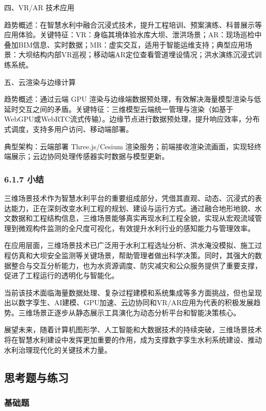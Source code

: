 四、VR/AR 技术应用

趋势概述：在智慧水利中融合沉浸式技术，提升工程培训、预案演练、科普展示等应用体验。关键特征：VR：身临其境体验水库大坝、泄洪场景；AR：现场巡检中叠加BIM信息、实时数据；MR：虚实交互，适用于智能运维支持；典型应用场景：大坝结构内部VR巡视；移动端AR定位查看管道埋设情况；洪水演练沉浸式训练系统。

五、云渲染与边缘计算

趋势概述：通过云端 GPU 渲染与边缘端数据预处理，有效解决海量模型渲染与低延时交互之间的矛盾。关键特征：三维模型云端统一管理与渲染（如基于WebGPU或WebRTC流式传输）。边缘节点进行数据预处理，提升响应效率，分布式调度，支持多用户访问、移动端部署。

典型架构：云端部署 Three.js/Cesium 渲染服务；前端接收渲染流画面，实现轻终端展示；云边协同处理传感器实时数据与模型更新。

\hypertarget{ux5c0fux7ed3}{%
\subsubsection{6.1.7 小结}\label{ux5c0fux7ed3}}

三维场景技术作为智慧水利平台的重要组成部分，凭借其直观、动态、沉浸式的表达能力，正在深刻改变水利工程的规划、建设与运行方式。通过融合地形地貌、水文数据和工程结构信息，三维场景能够真实再现水利工程全貌，实现从宏观流域管理到微观构件监测的全尺度可视化，有效提升水利行业的感知能力与管理效率。

在应用层面，三维场景技术已广泛用于水利工程选址分析、洪水淹没模拟、施工过程仿真和大坝安全监测等关键场景，帮助管理者做出科学决策。同时，其强大的数据整合与交互分析能力，也为水资源调度、防灾减灾和公众服务提供了重要支撑，促进了工程运行的透明化与智能化。

当前该技术面临海量数据处理、复杂过程建模和系统集成等多方面挑战，但也呈现出以数字孪生、AI建模、GPU加速、云边协同和VR/AR应用为代表的积极发展趋势。三维场景正逐步从静态展示工具演化为动态分析平台和智能决策核心。

展望未来，随着计算机图形学、人工智能和大数据技术的持续突破，三维场景技术将在智慧水利建设中发挥更加重要的作用，成为支撑数字孪生水利系统建设、推动水利治理现代化的关键技术力量。

\hypertarget{ux601dux8003ux9898ux4e0eux7ec3ux4e60-2}{%
\subsection{思考题与练习}\label{ux601dux8003ux9898ux4e0eux7ec3ux4e60-2}}

\hypertarget{ux57faux7840ux9898-2}{%
\subsubsection{基础题}\label{ux57faux7840ux9898-2}}

